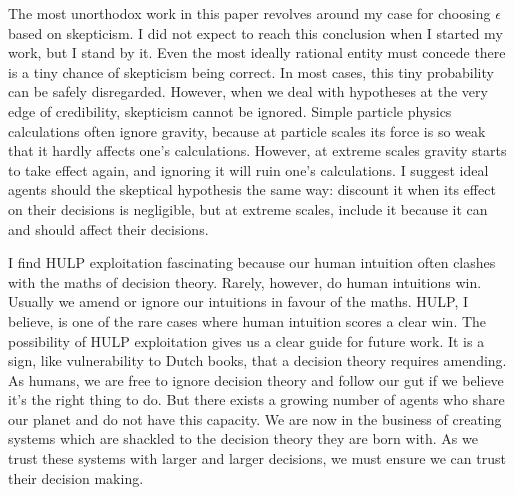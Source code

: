 \documentclass{article}
\begin{document}
The most unorthodox work in this paper revolves around my case for choosing \(\epsilon\) based on skepticism. I did not expect to reach this conclusion when I started my work, but I stand by it. Even the most ideally rational entity must concede there is a tiny chance of skepticism being correct. In most cases, this tiny probability can be safely disregarded. However, when we deal with hypotheses at the very edge of credibility, skepticism cannot be ignored. Simple particle physics calculations often ignore gravity, because at particle scales its force is so weak that it hardly affects one's calculations. However, at extreme scales gravity starts to take effect again, and ignoring it will ruin one's calculations. I suggest ideal agents should the skeptical hypothesis the same way: discount it when its effect on their decisions is negligible, but at extreme scales, include it because it can and should affect their decisions.

I find HULP exploitation fascinating because our human intuition often clashes with the maths of decision theory. Rarely, however, do human intuitions win. Usually we amend or ignore our intuitions in favour of the maths. HULP, I believe, is one of the rare cases where human intuition scores a clear win. The possibility of HULP exploitation gives us a clear guide for future work. It is a sign, like vulnerability to Dutch books, that a decision theory requires amending. As humans, we are free to ignore decision theory and follow our gut if we believe it's the right thing to do. But there exists a growing number of agents who share our planet and do not have this capacity. We are now in the business of creating systems which are shackled to the decision theory they are born with. As we trust these systems with larger and larger decisions, we must ensure we can trust their decision making.




\end{document}

